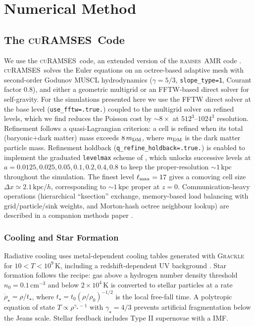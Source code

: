 \documentclass[fleqn,usenatbib]{mnras}
\newcommand{\ramses}{\textsc{ramses}}
\newcommand{\curamses}{\textsc{cuRAMSES}}
\newcommand{\code}[1]{\texttt{#1}}
\newcommand{\kpc}{\,\mathrm{kpc}}
\begin{document}
\section{Numerical Method}
\label{sec:method}

\subsection{The \curamses\ Code}
\label{sec:code}

We use the \curamses\ code, an extended version of the \ramses\ AMR
code \citep{Teyssier2002}.  \curamses\ solves the Euler equations on
an octree-based adaptive mesh with second-order Godunov MUSCL
hydrodynamics ($\gamma = 5/3$, \code{slope\_type=1}, Courant factor
$0.8$), and either a geometric multigrid or an FFTW-based direct
solver for self-gravity.  For the simulations presented here we use
the FFTW direct solver at the base level (\code{use\_fftw=.true.})
coupled to the multigrid solver on refined levels, which we find
reduces the Poisson cost by $\sim 8\times$ at $512^3$--$1024^3$
resolution.  Refinement follows a quasi-Lagrangian criterion: a cell
is refined when its total (baryonic$+$dark matter) mass exceeds
$8\,m_{\rm DM}$, where $m_{\rm DM}$ is the dark matter particle
mass.  Refinement holdback (\code{q\_refine\_holdback=.true.}) is
enabled to implement the graduated \code{levelmax} scheme of
\citet{Snaith2018}, which unlocks successive levels at
$a=0.0125,0.025,0.05,0.1,0.2,0.4,0.8$ to keep the proper-resolution
$\sim 1\kpc$ throughout the simulation.  The finest level
$\ell_{\rm max}=17$ gives a comoving cell size $\Delta x \simeq
2.1\,\mathrm{kpc}/h$, corresponding to $\sim 1\kpc$ proper at $z=0$.
Communication-heavy operations (hierarchical ``ksection'' exchange,
memory-based load balancing with grid/particle/sink weights, and
Morton-hash octree neighbour lookup) are described in a companion
methods paper \citep{Kim2024}.

\subsubsection{Cooling and Star Formation}

Radiative cooling uses metal-dependent cooling tables generated with
\textsc{Grackle} \citep{Smith2017} for $10 < T < 10^9$\,K, including
a redshift-dependent UV background \citep{Haardt2012}.  Star formation
follows the \citet{Rasera2006} recipe: gas above a hydrogen number
density threshold $n_0 = 0.1\,\mathrm{cm^{-3}}$ and below $2 \times
10^4$\,K is converted to stellar particles at a rate $\dot{\rho}_\star
= \rho / t_\star$, where $t_\star = t_0 (\rho / \rho_0)^{-1/2}$ is
the local free-fall time.  A polytropic equation of state $T \propto
\rho^{\gamma_\star - 1}$ with $\gamma_\star = 4/3$ prevents artificial
fragmentation below the Jeans scale.  Stellar feedback includes Type
II supernovae with a \citet{Chabrier2003} IMF.
\end{document}
